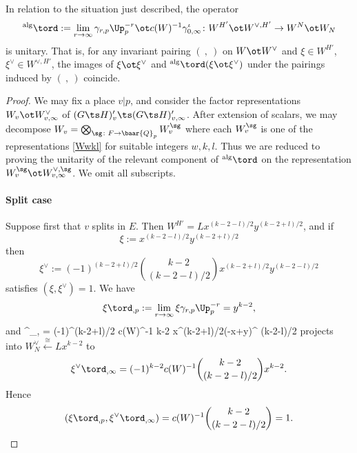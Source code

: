 \begin{lemm}  In relation to the situation just described, the operator
$${}^{\rm alg}\tord:=  \lim_{r\to \infty} \gamma_{r, p}\Up_{p}^{-r}\ot  c(W)^{-1}\gamma_{0, \infty}^{\iota}\colon W^{H'}\ot W^{\vee, H'} \to W^{N}\ot W_{N}$$
is unitary.  That is, for any invariant pairing $(\ , \ )$ on $W\ot W^{\vee}$ and $\xi\in W^{H'}$, $\xi^{\vee}\in W^{\vee, H'}$, the images of $\xi\ot \xi^{\vee}$ and  ${}^{\rm alg}\tord (\xi\ot \xi^{\vee})$  under the pairings induced by $(\ , \  )$ coincide.
\end{lemm}



\begin{proof}
We may fix a place $v\vert p$, and consider the factor representations $W_{v}\ot W_{v,\infty}^{\vee}$  of $(G\ts H)'_{v} \ts(G\ts H)'_{v, \infty}$.  After extension of scalars, we may decompose $W_{v}=\bigotimes_{\sg\colon F\to \baar{Q}_{p}}W_{v}^{\sg}$ where each $W_{v}^{\sg}$ is one of the representations \eqref{Wwkl} for suitable integers $w, k, l$. Thus we are reduced to proving the unitarity of the relevant component of ${}^{\rm alg}\tord$ on the  representation $W_{v}^{\sg}\ot W_{v, \infty}^{\vee, \sg}$. We omit all subscripts.


\paragraph{Split case}
Suppose first that $v$ splits in $E$.  Then $W^{H'}= Lx^{(k-2-l)/2} y^{(k-2+l)/2}$, and if
$$\xi:= x^{(k-2-l)/2} y^{(k-2+l)/2} $$ then $$\xi^{\vee}:=   (-1)^{(k-2+l)/2} {k-2 \choose  {(k-2-l)/2}} x^{(k-2+l)/2}y^{ (k-2-l)/2}$$ satisfies $( \xi, \xi^{\vee})=1$.
We have
$$ \xi {\tord}_{, p}:=\lim_{r\to \infty} \xi \gamma_{r, p}\Up_{p}^{-r}  = y^{k-2},  $$
and
\beqq
\xi^{\vee}{\tord}_{,\infty}
= (-1)^{(k-2+l)/2}   c(W)^{-1} {k-2 }  x^{(k-2+l)/2}(-x+y)^{ (k-2-l)/2}
\eeqq
projects into $W^{\vee}_{N} \stackrel{\cong}{\leftarrow} Lx^{k-2}$ to
$$\xi^{\vee}{\tord}_{,\infty} =   (-1)^{k-2}   c(W)^{-1}   {k-2 \choose  {(k-2-l)/2}}  x^{k-2}.$$
Hence
$$(  \xi {\tord}_{, p}, \xi^{\vee}{\tord}_{,\infty})=   c(W)^{-1}   {k-2 \choose  {(k-2-l)/2}} =1.$$


\end{proof}
